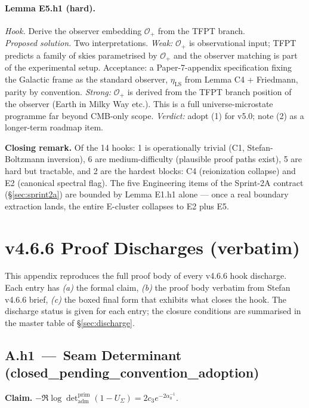 \paragraph{Lemma E5.h1 (hard).}
\emph{Hook.}  Derive the observer embedding \(\mathcal O_+\) from the
TFPT branch.\\
\emph{Proposed solution.}  Two interpretations.
\emph{Weak:} \(\mathcal O_+\) is observational input; TFPT predicts a
family of skies parametrised by \(\mathcal O_+\) and the observer
matching is part of the experimental setup.  Acceptance: a
Paper-7-appendix specification fixing the Galactic frame as the
standard observer, \(\eta_{\mathrm{LS}}\) from Lemma C4 + Friedmann,
parity by convention.
\emph{Strong:} \(\mathcal O_+\) is derived from the TFPT branch
position of the observer (Earth in Milky Way etc.).  This is a full
universe-microstate programme far beyond CMB-only scope.
\emph{Verdict:} adopt (1) for v5.0; note (2) as a longer-term
roadmap item.

\bigskip

\noindent\textbf{Closing remark.}  Of the 14 hooks: 1 is operationally
trivial (C1, Stefan-Boltzmann inversion), 6 are medium-difficulty
(plausible proof paths exist), 5 are hard but tractable, and 2 are
the hardest blocks: C4 (reionization collapse) and E2 (canonical
spectral flag).  The five Engineering items of the Sprint-2A contract
(\S\ref{sec:sprint2a}) are bounded by Lemma E1.h1 alone --- once a
real boundary extraction lands, the entire E-cluster collapses to E2
plus E5.

\section{v4.6.6 Proof Discharges (verbatim)}
\label{app:discharge}

This appendix reproduces the full proof body of every v4.6.6 hook
discharge.  Each entry has \emph{(a)} the formal claim, \emph{(b)}
the proof body verbatim from Stefan v4.6.6 brief, \emph{(c)} the
boxed final form that exhibits what closes the hook.  The discharge
status is given for each entry; the closure conditions are summarised
in the master table of \S\ref{sec:discharge}.

\subsection*{A.h1 \,---\, Seam Determinant
\,(\textsf{closed\_pending\_convention\_adoption})}
\textbf{Claim.}
\(-\Re\log\det_{\mathrm{adm}}^{\mathrm{prim}}(1-U_\Sigma)
=2c_3 e^{-2\alpha_0^{-1}}.\)

